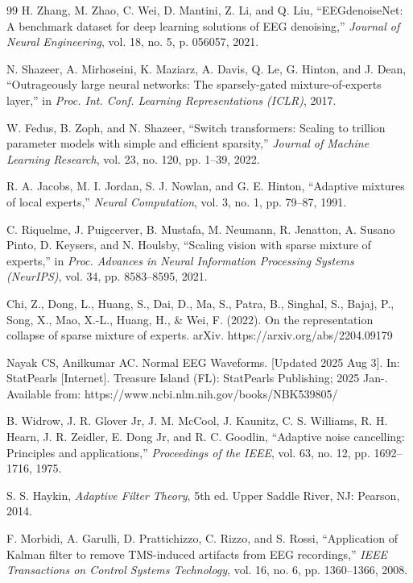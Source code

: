 \documentclass{article}
\begin{document}
\begin{thebibliography}{99}
H. Zhang, M. Zhao, C. Wei, D. Mantini, Z. Li, and Q. Liu, ``EEGdenoiseNet: A benchmark dataset for deep learning solutions of EEG denoising,'' \textit{Journal of Neural Engineering}, vol. 18, no. 5, p. 056057, 2021.

N. Shazeer, A. Mirhoseini, K. Maziarz, A. Davis, Q. Le, G. Hinton, and J. Dean, ``Outrageously large neural networks: The sparsely-gated mixture-of-experts layer,'' in \textit{Proc. Int. Conf. Learning Representations (ICLR)}, 2017.

W. Fedus, B. Zoph, and N. Shazeer, ``Switch transformers: Scaling to trillion parameter models with simple and efficient sparsity,'' \textit{Journal of Machine Learning Research}, vol. 23, no. 120, pp. 1--39, 2022.

R. A. Jacobs, M. I. Jordan, S. J. Nowlan, and G. E. Hinton, ``Adaptive mixtures of local experts,'' \textit{Neural Computation}, vol. 3, no. 1, pp. 79--87, 1991.

C. Riquelme, J. Puigcerver, B. Mustafa, M. Neumann, R. Jenatton, A. Susano Pinto, D. Keysers, and N. Houlsby, ``Scaling vision with sparse mixture of experts,'' in \textit{Proc. Advances in Neural Information Processing Systems (NeurIPS)}, vol. 34, pp. 8583--8595, 2021.

Chi, Z., Dong, L., Huang, S., Dai, D., Ma, S., Patra, B., Singhal, S., Bajaj, P., Song, X., Mao, X.-L., Huang, H., $\&$ Wei, F. (2022). On the representation collapse of sparse mixture of experts. arXiv. https://arxiv.org/abs/2204.09179

Nayak CS, Anilkumar AC. Normal EEG Waveforms. [Updated 2025 Aug 3]. In: StatPearls [Internet]. Treasure Island (FL): StatPearls Publishing; 2025 Jan-. Available from: https://www.ncbi.nlm.nih.gov/books/NBK539805/

B. Widrow, J. R. Glover Jr, J. M. McCool, J. Kaunitz, C. S. Williams, R. H. Hearn, J. R. Zeidler, E. Dong Jr, and R. C. Goodlin, ``Adaptive noise cancelling: Principles and applications,'' \textit{Proceedings of the IEEE}, vol. 63, no. 12, pp. 1692--1716, 1975.

S. S. Haykin, \textit{Adaptive Filter Theory}, 5th ed. Upper Saddle River, NJ: Pearson, 2014.

F. Morbidi, A. Garulli, D. Prattichizzo, C. Rizzo, and S. Rossi, ``Application of Kalman filter to remove TMS-induced artifacts from EEG recordings,'' \textit{IEEE Transactions on Control Systems Technology}, vol. 16, no. 6, pp. 1360--1366, 2008.


\end{thebibliography}
\end{document}
